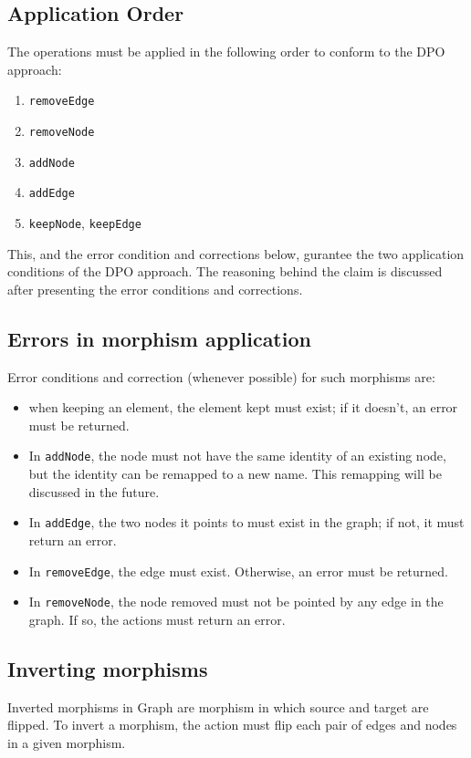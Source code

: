 \documentclass[a4paper]{report}
\begin{document}
\subsection{Application Order}
\label{ssec:order}
The operations must be applied in the following order to conform to the DPO approach:
\begin{enumerate}
	\item \texttt{removeEdge}
	\item \texttt{removeNode}
	\item \texttt{addNode}
	\item \texttt{addEdge}
	\item \texttt{keepNode}, \texttt{keepEdge}
\end{enumerate}

This, and the error condition and corrections below, gurantee the two application conditions of the DPO approach. The reasoning behind the claim is discussed after presenting the error conditions and corrections.

\subsection{Errors in morphism application}
Error conditions and correction (whenever possible) for such morphisms are:
\begin{itemize}
	\item when keeping an element, the element kept must exist; if it doesn't, an error must be returned. 
	\item In \texttt{addNode}, the node must not have the same identity of an existing node, but the identity can be remapped to a new name. This remapping will be discussed in the future.
	\item In \texttt{addEdge}, the two nodes it points to must exist in the graph; if not, it must return an error.
	\item In \texttt{removeEdge}, the edge must exist. Otherwise, an error must be returned.
	\item In \texttt{removeNode}, the node removed must not be pointed by any edge in the graph. If so, the actions must return an error.
\end{itemize}

\subsection{Inverting morphisms}
Inverted morphisms in Graph are morphism in which source and target are flipped. To invert a morphism, the action must flip each pair of edges and nodes in a given morphism.
\end{document}
